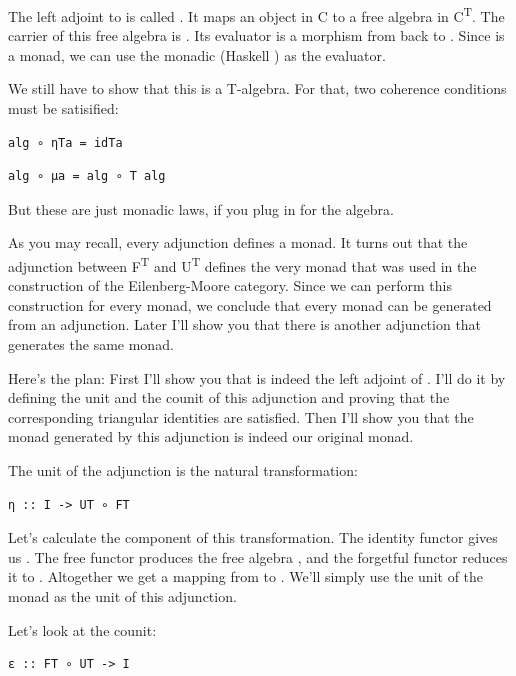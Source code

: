 The left adjoint to  is called . It maps an object
 in C to a free algebra in C\textsuperscript{T}. The carrier
of this free algebra is . Its evaluator is a morphism from
 back to . Since  is a monad,
we can use the monadic  (Haskell ) as the
evaluator.

We still have to show that this is a T-algebra. For that, two coherence
conditions must be satisified:

\begin{verbatim}
alg ∘ ηTa = idTa
\end{verbatim}

\begin{verbatim}
alg ∘ μa = alg ∘ T alg
\end{verbatim}

But these are just monadic laws, if you plug in  for the
algebra.

As you may recall, every adjunction defines a monad. It turns out that
the adjunction between F\textsuperscript{T} and U\textsuperscript{T}
defines the very monad  that was used in the construction of
the Eilenberg-Moore category. Since we can perform this construction for
every monad, we conclude that every monad can be generated from an
adjunction. Later I'll show you that there is another adjunction that
generates the same monad.

Here's the plan: First I'll show you that  is indeed the left
adjoint of . I'll do it by defining the unit and the counit
of this adjunction and proving that the corresponding triangular
identities are satisfied. Then I'll show you that the monad generated by
this adjunction is indeed our original monad.

The unit of the adjunction is the natural transformation:

\begin{verbatim}
η :: I -> UT ∘ FT
\end{verbatim}

Let's calculate the  component of this transformation. The
identity functor gives us . The free functor produces the free
algebra , and the forgetful functor reduces it to
. Altogether we get a mapping from  to
. We'll simply use the unit of the monad  as the
unit of this adjunction.

Let's look at the counit:

\begin{verbatim}
ε :: FT ∘ UT -> I
\end{verbatim}

